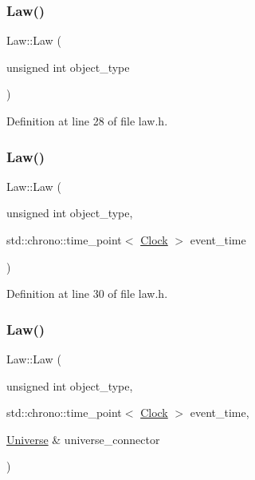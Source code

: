 \subsubsection{\texorpdfstring{Law()}{Law()}\hspace{0.1cm}{\footnotesize\ttfamily [2/4]}}
{\footnotesize\ttfamily Law\+::\+Law (\begin{DoxyParamCaption}\item[{unsigned int}]{object\+\_\+type }\end{DoxyParamCaption})\hspace{0.3cm}{\ttfamily [inline]}}



Definition at line 28 of file law.\+h.

\mbox{\label{class_law_afdc75daa3a3346c473454c7a4dc2eab5}} 
\subsubsection{\texorpdfstring{Law()}{Law()}\hspace{0.1cm}{\footnotesize\ttfamily [3/4]}}
{\footnotesize\ttfamily Law\+::\+Law (\begin{DoxyParamCaption}\item[{unsigned int}]{object\+\_\+type,  }\item[{std\+::chrono\+::time\+\_\+point$<$ \mbox{\hyperlink{universe_8h_a0ef8d951d1ca5ab3cfaf7ab4c7a6fd80}{Clock}} $>$}]{event\+\_\+time }\end{DoxyParamCaption})\hspace{0.3cm}{\ttfamily [inline]}}



Definition at line 30 of file law.\+h.

\mbox{\label{class_law_aa4fb7baf54aa77720605fd601fb80b8d}} 
\subsubsection{\texorpdfstring{Law()}{Law()}\hspace{0.1cm}{\footnotesize\ttfamily [4/4]}}
{\footnotesize\ttfamily Law\+::\+Law (\begin{DoxyParamCaption}\item[{unsigned int}]{object\+\_\+type,  }\item[{std\+::chrono\+::time\+\_\+point$<$ \mbox{\hyperlink{universe_8h_a0ef8d951d1ca5ab3cfaf7ab4c7a6fd80}{Clock}} $>$}]{event\+\_\+time,  }\item[{\mbox{\hyperlink{class_universe}{Universe}} \&}]{universe\+\_\+connector }\end{DoxyParamCaption})\hspace{0.3cm}{\ttfamily [inline]}}



